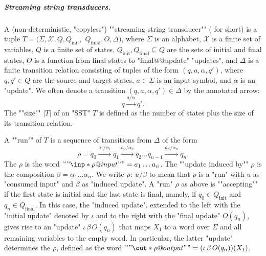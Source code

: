 \documentclass{theoretics}
\newcommand{\aut}{A}
\newcommand{\sst}{T}
\newcommand{\var}{\mathcal{X}}
\newcommand{\alp}{\Sigma}
\newcommand{\sub}[2]{{\mathcal S}_{#1,#2}}
\newcommand{\finalupd}{O}
\begin{document}
\medskip
\subparagraph{\bf Streaming string transducers.}
A (non-deterministic, "copyless") 
""streaming string transducer""
( for short) 
is a tuple 
$T = (\alp, \var, Q, Q_{\mathrm{init}},$  $Q_{\mathrm{final}}, \finalupd, \Delta)$,
where $\alp$ is an alphabet, $\var$ is a finite set of variables, $Q$ is a finite set of states, 
$Q_{\mathrm{init}}, Q_{\mathrm{final}} \subseteq Q$ are the sets of 
initial and final states, $\finalupd$ is a function from final states
to "final@@update" "updates", and
$\Delta$ is a finite transition relation consisting of tuples of the form 
$(q, a, \alpha, q')$, where $q,q'\in Q$ are the source and target states, 
$a\in\alp$ is an input symbol, and $\alpha$ is an "update".
We often denote a transition $(q, a, \alpha, q')\in\Delta$ by the 
annotated arrow:
\[q \xrightarrow{a/\alpha} q'.\]
\AP
The ""size"" $|T|$ of an "SST" $T$ is defined as the number 
of states plus the size of its transition relation.


\AP
A ""run"" of $\sst$ 
is a sequence of transitions from $\Delta$ of the form
\[
\rho = q_0 \xrightarrow{a_1/\alpha_1} q_1 \xrightarrow{a_2/\alpha_2} q_2 \dots
q_{n-1} \xrightarrow{a_n/\alpha_n} q_n.
\]
\AP
The  $\rho$ is the word
$""\inp*{\rho} @input"" = a_1\dots a_n$.
\AP
The ""update induced by"" $\rho$ is the composition $\beta = \alpha_1 \dots \alpha_n$.
We write $\rho:\: u/\beta$ 
to mean that $\rho$ is a "run" with $u$ as
"consumed input" and $\beta$ as "induced update".
\AP
A "run" $\rho$ as above is ""accepting"" if
the first state is initial and the last state is final,
namely, if $q_0\in Q_{\mathrm{init}}$ and $q_n\in Q_{\mathrm{final}}$. 
\AP
In this case, the "induced update", extended to the left
with the "initial update" denoted by $\iota$ and to the right with
the "final update" $\finalupd(q_n)$, gives rise to an
"update" $\iota \, \beta \, \finalupd(q_n)$ that maps $X_1$ to a word 
over $\alp$ and all remaining variables to the empty word.
In particular, the latter "update" determines the 
 $\rho$,
defined as the word 
$""\out*{\rho} @output"" = (\iota \, \beta \, \finalupd(q_n))(X_1)$.
\end{document}
